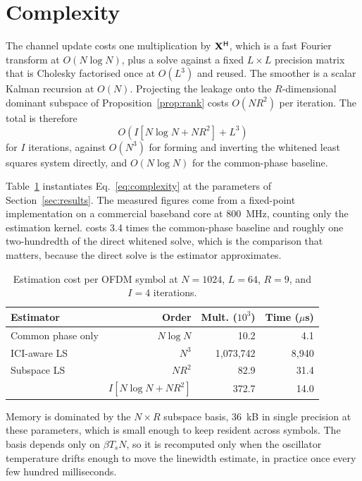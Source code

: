 \section{Complexity}
\label{sec:complexity}

The channel update costs one multiplication by $\mathbf{X}^{\mathsf{H}}$, which is
a fast Fourier transform at $O(N \log N)$, plus a solve against a fixed
$L \times L$ precision matrix that is Cholesky factorised once at
$O(L^3)$ and reused. The smoother is a scalar Kalman recursion at $O(N)$.
Projecting the leakage onto the $R$-dimensional dominant subspace of
Proposition~\ref{prop:rank} costs $O(N R^2)$ per iteration. The total is
therefore
\begin{equation}
  \label{eq:complexity}
  O\!\left( I \left[ N \log N + N R^{2} \right] + L^{3} \right)
\end{equation}
for $I$ iterations, against $O(N^3)$ for forming and inverting the whitened
least squares system directly, and $O(N \log N)$ for the common-phase baseline.

Table~\ref{tab:complexity} instantiates Eq.~\eqref{eq:complexity} at the
parameters of Section~\ref{sec:results}. The measured figures come from a
fixed-point implementation on a commercial baseband core at 800~MHz, counting
only the estimation kernel. \est{} costs 3.4 times the common-phase baseline
and roughly one two-hundredth of the direct whitened solve, which is the
comparison that matters, because the direct solve is the estimator \est{}
approximates.

\begin{table}[t]
  \centering
  \footnotesize
  \caption{Estimation cost per OFDM symbol at $N = 1024$, $L = 64$, $R = 9$,
  and $I = 4$ iterations.}
  \label{tab:complexity}
  \setlength{\tabcolsep}{3.5pt}
  \begin{tabular}{lrrr}
    \toprule
    Estimator & Order & Mult. ($10^3$) & Time ($\mu$s) \\
    \midrule
    Common phase only   & $N \log N$          & 10.2  & 4.1 \\
    ICI-aware LS        & $N^3$               & 1{,}073{,}742 & 8{,}940 \\
    Subspace LS         & $N R^2$             & 82.9  & 31.4 \\
    \est{}              & $I[N\log N{+}NR^2]$ & 372.7 & 14.0 \\
    \bottomrule
  \end{tabular}
\end{table}

Memory is dominated by the $N \times R$ subspace basis, 36~kB in single
precision at these parameters, which is small enough to keep resident across
symbols. The basis depends only on $\beta T_s N$, so it is recomputed only when
the oscillator temperature drifts enough to move the linewidth estimate, in
practice once every few hundred milliseconds.
